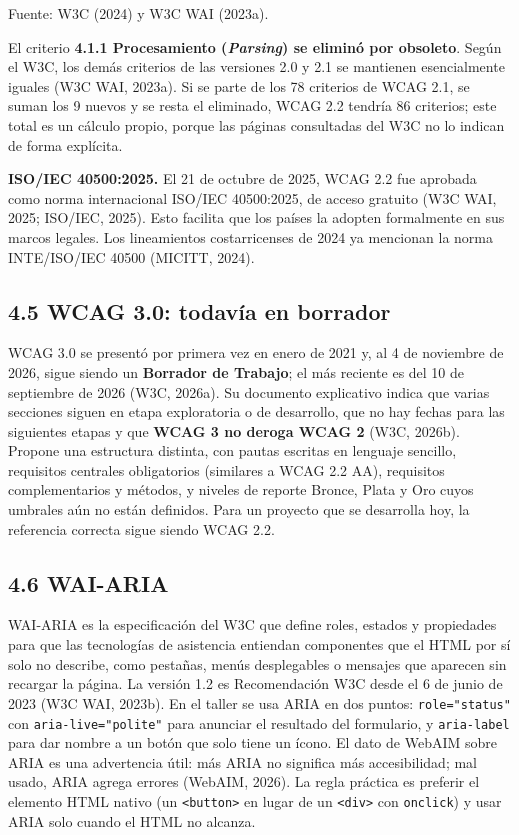 \documentclass[10pt,letterpaper,onecolumn]{IEEEtran}
\begin{document}
Fuente: W3C (2024) y W3C WAI (2023a).

El criterio \textbf{4.1.1 Procesamiento (\emph{Parsing}) se eliminó por obsoleto}. Según el W3C, los demás criterios de las versiones 2.0 y 2.1 se mantienen esencialmente iguales (W3C WAI, 2023a). Si se parte de los 78 criterios de WCAG 2.1, se suman los 9 nuevos y se resta el eliminado, WCAG 2.2 tendría 86 criterios; este total es un cálculo propio, porque las páginas consultadas del W3C no lo indican de forma explícita.

\textbf{ISO/IEC 40500:2025.} El 21 de octubre de 2025, WCAG 2.2 fue aprobada como norma internacional ISO/IEC 40500:2025, de acceso gratuito (W3C WAI, 2025; ISO/IEC, 2025). Esto facilita que los países la adopten formalmente en sus marcos legales. Los lineamientos costarricenses de 2024 ya mencionan la norma INTE/ISO/IEC 40500 (MICITT, 2024).

\subsection{4.5 WCAG 3.0: todavía en borrador}\label{wcag-3.0-todavuxeda-en-borrador}

WCAG 3.0 se presentó por primera vez en enero de 2021 y, al 4 de noviembre de 2026, sigue siendo un \textbf{Borrador de Trabajo}; el más reciente es del 10 de septiembre de 2026 (W3C, 2026a). Su documento explicativo indica que varias secciones siguen en etapa exploratoria o de desarrollo, que no hay fechas para las siguientes etapas y que \textbf{WCAG 3 no deroga WCAG 2} (W3C, 2026b). Propone una estructura distinta, con pautas escritas en lenguaje sencillo, requisitos centrales obligatorios (similares a WCAG 2.2 AA), requisitos complementarios y métodos, y niveles de reporte Bronce, Plata y Oro cuyos umbrales aún no están definidos. Para un proyecto que se desarrolla hoy, la referencia correcta sigue siendo WCAG 2.2.

\subsection{4.6 WAI-ARIA}\label{wai-aria}

WAI-ARIA es la especificación del W3C que define roles, estados y propiedades para que las tecnologías de asistencia entiendan componentes que el HTML por sí solo no describe, como pestañas, menús desplegables o mensajes que aparecen sin recargar la página. La versión 1.2 es Recomendación W3C desde el 6 de junio de 2023 (W3C WAI, 2023b). En el taller se usa ARIA en dos puntos: \texttt{role="status"} con \texttt{aria-\allowbreak{}\allowbreak{}live="polite"} para anunciar el resultado del formulario, y \texttt{aria-\allowbreak{}\allowbreak{}label} para dar nombre a un botón que solo tiene un ícono. El dato de WebAIM sobre ARIA es una advertencia útil: más ARIA no significa más accesibilidad; mal usado, ARIA agrega errores (WebAIM, 2026). La regla práctica es preferir el elemento HTML nativo (un \texttt{<button>} en lugar de un \texttt{<div>} con \texttt{onclick}) y usar ARIA solo cuando el HTML no alcanza.
\end{document}
